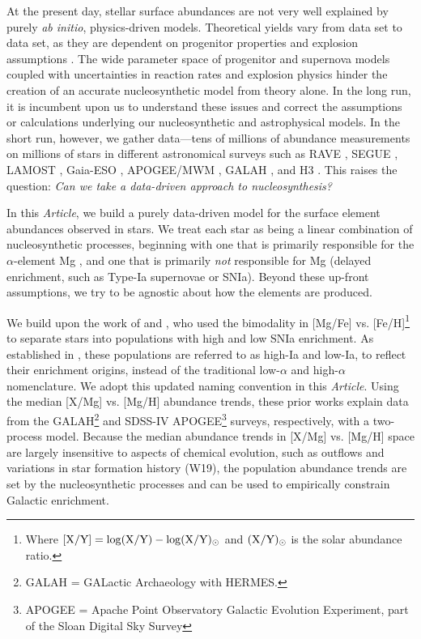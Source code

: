 \documentclass[modern]{aastex631}
\newcommand{\documentname}{\textsl{Article}}
\begin{document}
At the present day, stellar surface abundances are not very well explained by purely \textsl{ab initio}, physics-driven models.
Theoretical yields vary from data set to data set, as they are dependent on progenitor properties and explosion assumptions \citep[e.g.,][]{rybizki2017, blancato2019, buck2021, griffith2021b}. 
The wide parameter space of progenitor and supernova models coupled with uncertainties in reaction rates and explosion physics hinder the creation of an accurate nucleosynthetic model from theory alone.
In the long run, it is incumbent upon us to understand these issues and correct the assumptions or calculations underlying our nucleosynthetic and astrophysical models.
In the short run, however, we gather data---tens of millions of abundance measurements on millions of stars in different astronomical surveys such as RAVE \citep{steinmetz2006}, SEGUE \citep{yanny2009}, LAMOST \citep{luo2015}, Gaia-ESO \citep{gilmore2012, gilmore2022}, APOGEE/MWM \citep{majewski2017}, GALAH \citep{desilva2015}, and H3 \citep{conroy2019}.
This raises the question: \emph{Can we take a data-driven approach to nucleosynthesis?}

In this \documentname{}, we build a purely data-driven model for the surface element abundances observed in stars.
We treat each star as being a linear combination of nucleosynthetic processes, beginning with one that is primarily responsible for the $\alpha$-element Mg \citep[prompt enrichment, such as core-collapse supernovae or CCSN, e.g.,][]{andrews2017}, and one that is primarily \emph{not} responsible for Mg (delayed enrichment, such as Type-Ia supernovae or SNIa).
Beyond these up-front assumptions, we try to be agnostic about how the elements are produced.

We build upon the work of \citet[][hereafter G22]{griffith2019, griffith2022} and \citet[][hereafter W19, W22]{weinberg2019, weinberg2022}, who used the bimodality in [Mg/Fe] vs. [Fe/H]\footnote{Where $[{\rm X}/{\rm Y}] = \log({\rm X}/{\rm Y}) - \log({\rm X}/{\rm Y})_{\odot}$ and $({\rm X}/{\rm Y})_{\odot}$ is the solar abundance ratio.} \citep[e.g.,][]{fuhrmann1998, bensby2003, adibekyan2012} to separate stars into populations with high and low SNIa enrichment. As established in \citet{griffith2019}, these populations are referred to as high-Ia and low-Ia, to reflect their enrichment origins, instead of the traditional low-$\alpha$ and high-$\alpha$ nomenclature. We adopt this updated naming convention in this \documentname. Using the median [X/Mg] vs. [Mg/H] abundance trends, these prior works explain data from the GALAH\footnote{GALAH = GALactic Archaeology with HERMES.} and SDSS-IV APOGEE\footnote{APOGEE = Apache Point Observatory Galactic Evolution Experiment, part of the Sloan Digital Sky Survey} surveys, respectively, with a two-process model. Because the median abundance trends in [X/Mg] vs. [Mg/H] space are largely insensitive to aspects of chemical evolution, such as outflows and variations in star formation history (W19), the population abundance trends are set by the nucleosynthetic processes and can be used to empirically constrain Galactic enrichment. 
\end{document}
